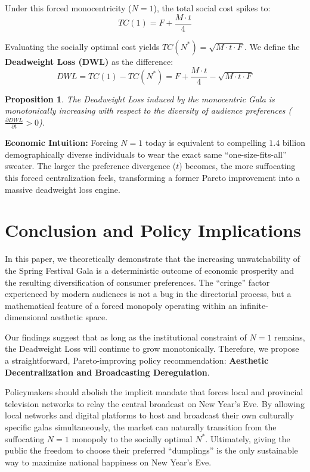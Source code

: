 \documentclass[AER]{AEA}
\newtheorem{proposition}[theorem]{Proposition}
\begin{document}
Under this forced monocentricity ($N = 1$), the total social cost spikes to:
\begin{equation}
    TC(1) = F + \frac{M \cdot t}{4}
\end{equation}

Evaluating the socially optimal cost yields $TC(N^*) = \sqrt{M \cdot t \cdot F}$. We define the \textbf{Deadweight Loss (DWL)} as the difference:
\begin{equation}
    DWL = TC(1) - TC(N^*) = F + \frac{M \cdot t}{4} - \sqrt{M \cdot t \cdot F}
\end{equation}

\begin{proposition}
The Deadweight Loss induced by the monocentric Gala is monotonically increasing with respect to the diversity of audience preferences ($\frac{\partial DWL}{\partial t} > 0$).
\end{proposition}

\noindent \textbf{Economic Intuition:} Forcing $N=1$ today is equivalent to compelling $1.4$ billion demographically diverse individuals to wear the exact same ``one-size-fits-all'' sweater. The larger the preference divergence ($t$) becomes, the more suffocating this forced centralization feels, transforming a former Pareto improvement into a massive deadweight loss engine.

\section{Conclusion and Policy Implications}

In this paper, we theoretically demonstrate that the increasing unwatchability of the Spring Festival Gala is a deterministic outcome of economic prosperity and the resulting diversification of consumer preferences. The ``cringe'' factor experienced by modern audiences is not a bug in the directorial process, but a mathematical feature of a forced monopoly operating within an infinite-dimensional aesthetic space.

Our findings suggest that as long as the institutional constraint of $N=1$ remains, the Deadweight Loss will continue to grow monotonically. Therefore, we propose a straightforward, Pareto-improving policy recommendation: \textbf{Aesthetic Decentralization and Broadcasting Deregulation}.

Policymakers should abolish the implicit mandate that forces local and provincial television networks to relay the central broadcast on New Year's Eve. By allowing local networks and digital platforms to host and broadcast their own culturally specific galas simultaneously, the market can naturally transition from the suffocating $N=1$ monopoly to the socially optimal $N^*$. Ultimately, giving the public the freedom to choose their preferred ``dumplings'' is the only sustainable way to maximize national happiness on New Year's Eve.
\end{document}
